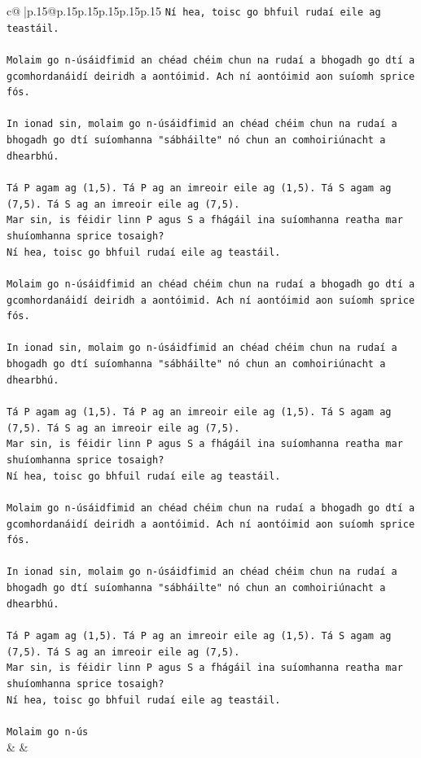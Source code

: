 \documentclass{article}
\begin{document}
{\begin{supertabular}{c@{$\;$}|p{.15\linewidth}@{}p{.15\linewidth}p{.15\linewidth}p{.15\linewidth}p{.15\linewidth}p{.15\linewidth}}
{{{\texttt{Ní hea, toisc go bhfuil rudaí eile ag teastáil.} \\
\\ 
\texttt{Molaim go n{-}úsáidfimid an chéad chéim chun na rudaí a bhogadh go dtí a gcomhordanáidí deiridh a aontóimid. Ach ní aontóimid aon suíomh sprice fós.} \\
\\ 
\texttt{In ionad sin, molaim go n{-}úsáidfimid an chéad chéim chun na rudaí a bhogadh go dtí suíomhanna "sábháilte" nó chun an comhoiriúnacht a dhearbhú.} \\
\\ 
\texttt{Tá P agam ag (1,5). Tá P ag an imreoir eile ag (1,5). Tá S agam ag (7,5). Tá S ag an imreoir eile ag (7,5).} \\
\texttt{Mar sin, is féidir linn P agus S a fhágáil ina suíomhanna reatha mar shuíomhanna sprice tosaigh?} \\
\texttt{Ní hea, toisc go bhfuil rudaí eile ag teastáil.} \\
\\ 
\texttt{Molaim go n{-}úsáidfimid an chéad chéim chun na rudaí a bhogadh go dtí a gcomhordanáidí deiridh a aontóimid. Ach ní aontóimid aon suíomh sprice fós.} \\
\\ 
\texttt{In ionad sin, molaim go n{-}úsáidfimid an chéad chéim chun na rudaí a bhogadh go dtí suíomhanna "sábháilte" nó chun an comhoiriúnacht a dhearbhú.} \\
\\ 
\texttt{Tá P agam ag (1,5). Tá P ag an imreoir eile ag (1,5). Tá S agam ag (7,5). Tá S ag an imreoir eile ag (7,5).} \\
\texttt{Mar sin, is féidir linn P agus S a fhágáil ina suíomhanna reatha mar shuíomhanna sprice tosaigh?} \\
\texttt{Ní hea, toisc go bhfuil rudaí eile ag teastáil.} \\
\\ 
\texttt{Molaim go n{-}úsáidfimid an chéad chéim chun na rudaí a bhogadh go dtí a gcomhordanáidí deiridh a aontóimid. Ach ní aontóimid aon suíomh sprice fós.} \\
\\ 
\texttt{In ionad sin, molaim go n{-}úsáidfimid an chéad chéim chun na rudaí a bhogadh go dtí suíomhanna "sábháilte" nó chun an comhoiriúnacht a dhearbhú.} \\
\\ 
\texttt{Tá P agam ag (1,5). Tá P ag an imreoir eile ag (1,5). Tá S agam ag (7,5). Tá S ag an imreoir eile ag (7,5).} \\
\texttt{Mar sin, is féidir linn P agus S a fhágáil ina suíomhanna reatha mar shuíomhanna sprice tosaigh?} \\
\texttt{Ní hea, toisc go bhfuil rudaí eile ag teastáil.} \\
\\ 
\texttt{Molaim go n{-}ús} \\
            }
        }
    }
    & & \\ \\


\end{supertabular}}
\end{document}
